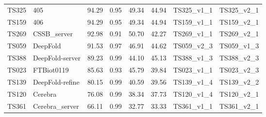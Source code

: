 \begin{table}[ht]
{\begin{tabular}{llllllll}
TS325 & 405 & 94.29 & 0.95 & 49.34 & 44.94 & TS325\_v1\_1 & TS325\_v2\_1 \\ 
TS159 & 406 & 94.29 & 0.95 & 49.34 & 44.94 & TS159\_v1\_1 & TS159\_v2\_1 \\ 
TS269 & CSSB\_server & 92.98 & 0.91 & 50.70 & 42.27 & TS269\_v1\_1 & TS269\_v2\_1 \\ 
TS059 & DeepFold & 91.53 & 0.97 & 46.91 & 44.62 & TS059\_v2\_3 & TS059\_v1\_3 \\ 
TS388 & DeepFold-server & 89.23 & 0.99 & 44.10 & 45.13 & TS388\_v1\_3 & TS388\_v2\_3 \\ 
TS023 & FTBiot0119 & 85.63 & 0.93 & 45.79 & 39.84 & TS023\_v1\_1 & TS023\_v2\_3 \\ 
TS139 & DeepFold-refine & 80.15 & 0.99 & 40.59 & 39.56 & TS139\_v1\_4 & TS139\_v2\_2 \\ 
TS120 & Cerebra & 76.08 & 0.99 & 38.34 & 37.73 & TS120\_v1\_4 & TS120\_v2\_1 \\ 
TS361 & Cerebra\_server & 66.11 & 0.99 & 32.77 & 33.33 & TS361\_v1\_1 & TS361\_v2\_1 \\ 
\bottomrule
\end{tabular}%
}
\end{table}
